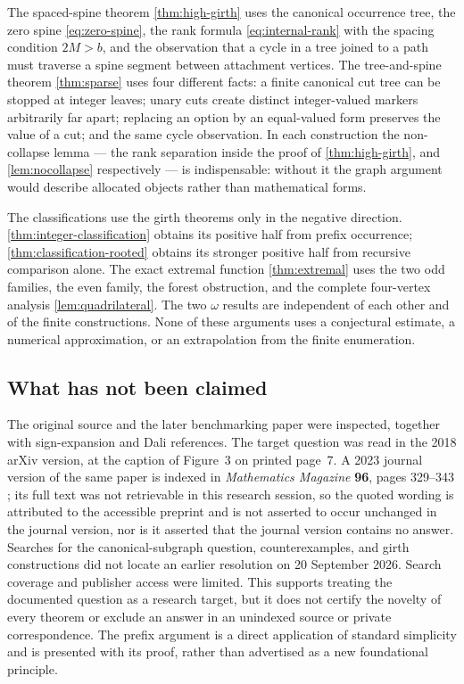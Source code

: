 \documentclass[11pt,a4paper]{article}
\numberwithin{equation}{section}
\theoremstyle{definition}
\theoremstyle{remark}
\begin{document}
The spaced-spine theorem \ref{thm:high-girth} uses the canonical occurrence
tree, the zero spine \eqref{eq:zero-spine}, the rank formula
\eqref{eq:internal-rank} with the spacing condition $2M>b$, and the observation
that a cycle in a tree joined to a path must traverse a spine segment between
attachment vertices. The tree-and-spine theorem \ref{thm:sparse} uses four
different facts: a finite canonical cut tree can be stopped at integer leaves;
unary cuts create distinct integer-valued markers arbitrarily far apart; replacing
an option by an equal-valued form preserves the value of a cut; and the same
cycle observation. In each construction the non-collapse lemma ---
the rank separation inside the proof of \cref{thm:high-girth}, and
\cref{lem:nocollapse} respectively --- is indispensable: without it the graph
argument would describe allocated objects rather than mathematical forms.

The classifications use the girth theorems only in the negative direction.
\cref{thm:integer-classification} obtains its positive half from prefix
occurrence; \cref{thm:classification-rooted} obtains its stronger positive half
from recursive comparison alone. The exact extremal function \ref{thm:extremal}
uses the two odd families, the even family, the forest obstruction, and the
complete four-vertex analysis \ref{lem:quadrilateral}. The two $\omega$ results
are independent of each other and of the finite constructions. None of these
arguments uses a conjectural estimate, a numerical approximation, or an
extrapolation from the finite enumeration.

\subsection{What has not been claimed}

The original source and the later benchmarking paper were inspected, together
with sign-expansion and Dali references. The target question was read in the 2018
arXiv version, at the caption of Figure~3 on printed page~7. A 2023 journal
version of the same paper is indexed in \emph{Mathematics Magazine} \textbf{96},
pages 329--343 \cite{Roughan2023}; its full text was not retrievable in this
research session, so the quoted wording is attributed to the accessible preprint
and is not asserted to occur unchanged in the journal version, nor is it asserted
that the journal version contains no answer. Searches for the canonical-subgraph
question, counterexamples, and girth constructions did not locate an earlier
resolution on 20 September 2026. Search coverage and publisher access were
limited. This supports treating the documented question as a research target,
but it does not certify the novelty of every theorem or exclude an answer in an
unindexed source or private correspondence. The prefix argument is a direct
application of standard simplicity and is presented with its proof, rather than
advertised as a new foundational principle.
\end{document}
